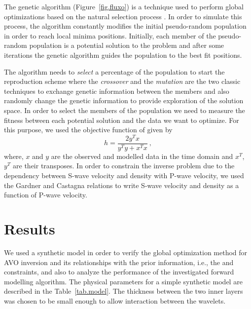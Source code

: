 \documentclass{vie16}
\begin{document}
The genetic algorithm (Figure~\ref{fig.fluxo}) is a technique
used to perform global optimizations based on the natural
selection process \citep{Holland1975}. In order to simulate this
process, the algorithm constantly modifies the initial
pseudo-random population in order to reach local minima
positions.  Initially, each member of the pseudo-random
population is a potential solution to the problem and after some
iterations the genetic algorithm guides the population to
the best fit positions.

The algorithm needs to \textit{select} a percentage of the
population to start the reproduction scheme where the
\textit{crossover} and the \textit{mutation} are the two classic
techniques to exchange genetic information between the members
and also randomly change the genetic information to provide
exploration of the solution space. In order to select the
members of the population we need to measure the fitness between
each potential solution and the data we want to optimize. For this
purpose, we used the objective function of \cite{Porsani2000}
given by
\begin{equation}
h = \frac{2y^{T} x} {y^{T}y + x^{T}x} \ ,
\label{eq.Porsani}
\end{equation}
where, $x$ and $y$ are the observed and
modelled data in the time domain and  $x^{T}$, $y^{T}$ are their
transposes. In order to constrain the inverse problem due to the
dependency between S-wave velocity and density with P-wave
velocity, we used the Gardner \citep{Gardner1974} and
Castagna \citep{Castagna1985} relations to write S-wave velocity and
density as a function of P-wave velocity.

\section{Results}
We used a synthetic model in order to verify the global
optimization method for AVO inversion and its relationships with
the prior information, i.e., the \cite{Gardner1974} and
\cite{Castagna1985} constraints, and also to analyze the
performance of the investigated forward modelling algorithm. The
physical parameters for a simple synthetic model are described
in the Table~\ref{tab.model}. The thickness between the two
inner layers was chosen to be small enough to allow interaction
between the wavelets.
\end{document}
